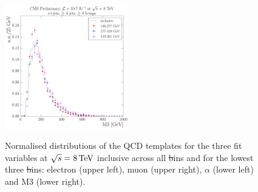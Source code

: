 \begin{figure}[hbtp]
     \includegraphics[width=0.48\textwidth]{Chapters/04_Analysis/04b_XSections/images/8TeV/fit_variables/ST/M3/qcd/ST_M3_0orMoreBtag_QCD_template_comparison.pdf}\\
	 \caption{Normalised distributions of the QCD templates for the three fit variables at $\sqrt{s}=8\,\text{Te\hspace{-.08em}V}$
	 inclusive across all \st bins and for the lowest three \st bins: electron \abseta (upper
	 left), muon \abseta (upper right), $\alpha$ (lower left) and M3 (lower right).}
     \label{fig:ST_fit_variable_qcd_comparisons_8TeV}
\end{figure}

